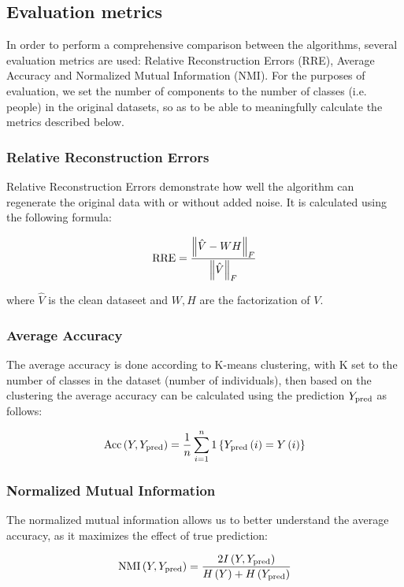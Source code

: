 \documentclass{article} %
\begin{document}
\subsection{Evaluation metrics}
In order to perform a comprehensive comparison between the algorithms, several evaluation metrics are used: Relative Reconstruction Errors (RRE), Average Accuracy and Normalized Mutual Information (NMI). For the purposes of evaluation, we set the number of components to the number of classes (i.e. people) in the original datasets, so as to be able to meaningfully calculate the metrics described below.

\subsubsection{Relative Reconstruction Errors}
Relative Reconstruction Errors demonstrate how well the algorithm can regenerate the original data with or without added noise. It is calculated using the following formula:

\begin{equation}
\textup{RRE} = \frac{\left\|\hat{V} - WH\right\|_F}{\left\|\hat{V}\right\|_F}
\end{equation}

where $\hat{V}$ is the clean dataseet and $W,H$ are the factorization of $V$.

\subsubsection{Average Accuracy}
The average accuracy is done according to K-means clustering, with K set to the number of classes in the dataset (number of individuals), then based on the clustering the average accuracy can be calculated using the prediction $Y_{\textup{pred}}$ as follows:

\begin{equation}
\textup{Acc}\left(Y,Y_{\textup{pred}}\right) = \frac{1}{n}\sum_{i=1}^{n}1\left\{Y_{\textup{pred}}\left(i\right) = Y\left(i\right)\right\}
\end{equation}

\subsubsection{Normalized Mutual Information}
The normalized mutual information allows us to better understand the average accuracy, as it maximizes the effect of true prediction:

\begin{equation}
\textup{NMI}\left(Y,Y_{\textup{pred}}\right) = \frac{2I\left(Y,Y_{\textup{pred}}\right)}{H\left(Y\right) + H\left(Y_{\textup{pred}}\right)}
\end{equation}
\end{document}
